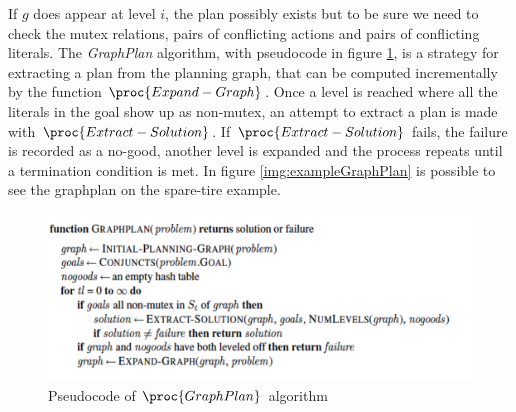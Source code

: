 If $g$ does appear at level $i$, the plan possibly exists but to be sure we need to check the 
mutex relations, pairs of conflicting actions and pairs of conflicting literals.\newline
The \emph{GraphPlan} algorithm, with pseudocode in figure \ref{img:graphplan}, is a strategy
for extracting a plan from the planning graph, that can be computed incrementally 
by the function $\proc{Expand-Graph}$.\newline
Once a level is reached where all the literals in the goal show up as non-mutex, an attempt to
extract a plan is made with $\proc{Extract-Solution}$.\newline
If $\proc{Extract-Solution}$ fails, the failure is recorded as a no-good, another level is 
expanded and the process repeats until a termination condition is met.\newline
In figure \ref{img:exampleGraphPlan} is possible to see the graphplan on the spare-tire example.

\begin{figure}
	\includegraphics[width=\textwidth]{Images/graphplan}
	\caption{Pseudocode of $\proc{GraphPlan}$ algorithm}
	\label{img:graphplan}
\end{figure}

